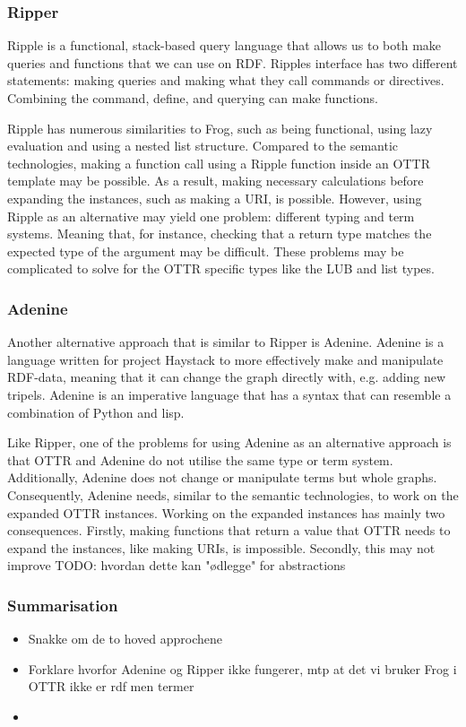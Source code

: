 \subsubsection{Ripper}
Ripple is a functional, stack-based query language that allows us to both make queries and functions that we can use on RDF. Ripples interface has two different statements: making queries and making what they call commands or directives. Combining the command, define, and querying can make functions.   

\para
Ripple has numerous similarities to Frog, such as being functional, using lazy evaluation and using a nested list structure. Compared to the semantic technologies, making a function call using a Ripple function inside an OTTR template may be possible. As a result, making necessary calculations before expanding the instances, such as making a URI, is possible. However, using Ripple as an alternative may yield one problem: different typing and term systems. Meaning that, for instance, checking that a return type matches the expected type of the argument may be difficult. These problems may be complicated to solve for the OTTR specific types like the LUB and list types.    

\subsubsection{Adenine}
Another alternative approach that is similar to Ripper is Adenine. Adenine is a language written for project Haystack to more effectively make and manipulate RDF-data, meaning that it can change the graph directly with, e.g. adding new tripels. Adenine is an imperative language that has a syntax that can resemble a combination of Python and lisp. 

\para
Like Ripper, one of the problems for using Adenine as an alternative approach is that OTTR and Adenine do not utilise the same type or term system. Additionally, Adenine does not change or manipulate terms but whole graphs. Consequently, Adenine needs, similar to the semantic technologies, to work on the expanded OTTR instances. Working on the expanded instances has mainly two consequences. Firstly, making functions that return a value that OTTR needs to expand the instances, like making URIs, is impossible. Secondly, this may not improve   TODO: hvordan dette kan "ødlegge" for abstractions

\subsubsection{Summarisation}
\begin{itemize}
    \item Snakke om de to hoved approchene
    \item Forklare hvorfor Adenine og Ripper ikke fungerer, mtp at det vi bruker Frog i OTTR ikke er rdf men termer
    \item 
\end{itemize}

